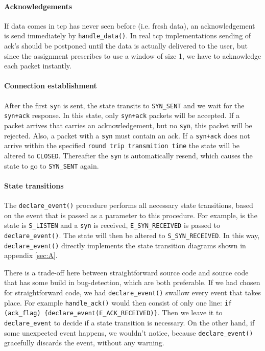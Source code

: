 \documentclass[11pt]{article}
\begin{document}
\paragraph{Acknowledgements}
    If data comes in tcp has never seen before (i.e. fresh data), an 
    acknowledgement is send
    immediately by \lstinline|handle_data()|. In real tcp implementations sending of
     ack's 
    should be postponed until the data is actually delivered to the user, 
    but since the assignment prescribes to use a window of size 1, we have to 
    acknowledge each packet instantly.

\paragraph{Connection establishment}
    After the first \lstinline|syn| is sent, 
    the state transits to \lstinline|SYN_SENT| 
    and we wait for the \lstinline|syn+ack| response. In this state, only 
    \lstinline|syn+ack| packets will be accepted. If a packet arrives that carries an
    acknowledgement, but no \lstinline|syn|, this packet will be rejected.
    Also, a packet with a \lstinline|syn| must contain an ack. 
    If a \lstinline|syn+ack| does not arrive within the specified 
    \lstinline|round trip transmition time| the state will be altered to 
    \lstinline|CLOSED|. Thereafter the \lstinline|syn| is automatically 
    resend, which causes the state to go to \lstinline|SYN_SENT| again.
    
    
\paragraph{State transitions}
    The \lstinline|declare_event()| procedure performs all necessary state 
    transitions, based on the event that is passed as a parameter to this 
    procedure. For example, 
    is the state is \lstinline|S_LISTEN| and a \lstinline|syn| is received, 
    \lstinline|E_SYN_RECEIVED| is passed to \lstinline|declare_event()|. The state will 
    then be altered to \lstinline|S_SYN_RECEIVED|. 
    In this way, \lstinline|declare_event()| directly implements the state 
    transition diagrams shown in appendix \ref{sec:A}.
    
    There is a trade-off here between straightforward source code and source 
    code that has some build in bug-detection, which are both preferable. If we 
    had chosen for straightforward code, we had \lstinline|declare_event()| swallow
    every event that takes place. For example \lstinline|handle_ack()| would then 
    consist of only one line: 
    \lstinline|if (ack_flag) {declare_event(E_ACK_RECEIVED)}|. Then we leave it to 
    \lstinline|declare_event| to decide if a state transition is necessary.
    On the other hand, if
    some unexpected event happens, we wouldn't notice, because 
    \lstinline|declare_event()| gracefully discards the event, without any warning.
    
\end{document}
